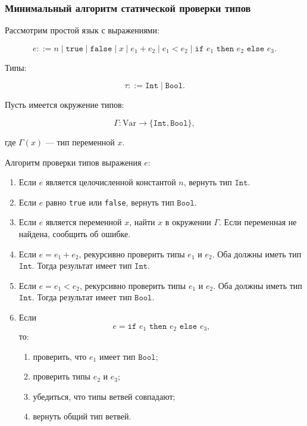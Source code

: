 \documentclass[12pt,a4paper]{article}
\begin{document}
\subsubsection{Минимальный алгоритм статической проверки типов}

Рассмотрим простой язык с выражениями:

\[
e ::= n \mid \texttt{true} \mid \texttt{false} \mid x
    \mid e_1 + e_2
    \mid e_1 < e_2
    \mid \texttt{if } e_1 \texttt{ then } e_2 \texttt{ else } e_3.
\]

Типы:

\[
\tau ::= \texttt{Int} \mid \texttt{Bool}.
\]

Пусть имеется окружение типов:

\[
\Gamma : \text{Var} \to \{\texttt{Int}, \texttt{Bool}\},
\]

где \(\Gamma(x)\) --- тип переменной \(x\).

Алгоритм проверки типов выражения \(e\):

\begin{enumerate}
    \item Если \(e\) является целочисленной константой \(n\), вернуть тип
    \(\texttt{Int}\).
    \item Если \(e\) равно \texttt{true} или \texttt{false}, вернуть тип
    \(\texttt{Bool}\).
    \item Если \(e\) является переменной \(x\), найти \(x\) в окружении \(\Gamma\).
    Если переменная не найдена, сообщить об ошибке.
    \item Если \(e = e_1 + e_2\), рекурсивно проверить типы \(e_1\) и \(e_2\).
    Оба должны иметь тип \(\texttt{Int}\). Тогда результат имеет тип \(\texttt{Int}\).
    \item Если \(e = e_1 < e_2\), рекурсивно проверить типы \(e_1\) и \(e_2\).
    Оба должны иметь тип \(\texttt{Int}\). Тогда результат имеет тип \(\texttt{Bool}\).
    \item Если
    \[
    e = \texttt{if } e_1 \texttt{ then } e_2 \texttt{ else } e_3,
    \]
    то:
    \begin{enumerate}
        \item проверить, что \(e_1\) имеет тип \(\texttt{Bool}\);
        \item проверить типы \(e_2\) и \(e_3\);
        \item убедиться, что типы ветвей совпадают;
        \item вернуть общий тип ветвей.
    \end{enumerate}
\end{enumerate}
\end{document}
